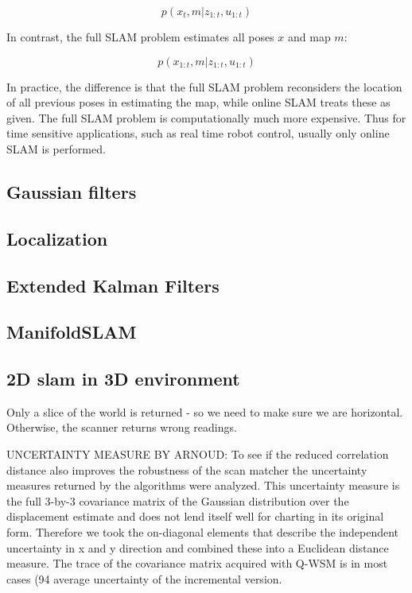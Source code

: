 \begin{equation}
p(x_{t}, m | z_{1:t}, u_{1:t})
\end{equation}

In contrast, the full SLAM problem estimates all poses $x$ and map $m$:

\begin{equation}
p(x_{1:t}, m | z_{1:t}, u_{1:t})
\end{equation}

In practice, the difference is that the full SLAM problem reconsiders the location of all previous poses in estimating the map, while online SLAM treats these as given. The full SLAM problem is computationally much more expensive. Thus for time sensitive applications, such as real time robot control, usually only online SLAM is performed.





\subsection{Gaussian filters}


\subsection{Localization}


\subsection{Extended Kalman Filters}

\subsection{ManifoldSLAM}


\subsection{2D slam in 3D environment}
Only a slice of the world is returned - so we need to make sure we are horizontal. Otherwise, the scanner returns wrong readings.


UNCERTAINTY MEASURE BY ARNOUD:
To see if the reduced correlation distance also improves the robustness of
the scan matcher the uncertainty measures returned by the algorithms were
analyzed. This uncertainty measure is the full 3-by-3 covariance matrix of the
Gaussian distribution over the displacement estimate and does not lend itself well
for charting in its original form. Therefore we took the on-diagonal elements that
describe the independent uncertainty in x and y direction and combined these
into a Euclidean distance measure. The trace of the covariance matrix acquired
with Q-WSM is in most cases (94%
average uncertainty of the incremental version.


